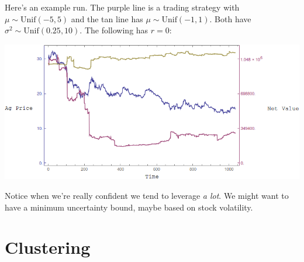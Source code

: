 \documentclass{article}
\begin{document}
Here's an example run. The purple line is a trading strategy with $\mu\sim\text{Unif}(-5,5)$ and the tan line has $\mu\sim\text{Unif}(-1,1)$. Both have $\sigma^2\sim\text{Unif}(0.25,10)$. The following has $r=0$:

\begin{center}
\includegraphics[scale=0.5]{../KellyRun-Random.png}
\end{center}

Notice when we're really confident we tend to leverage {\em a lot}. We might want to have a minimum uncertainty bound, maybe based on stock volatility.

	\section{Clustering}
\end{document}
